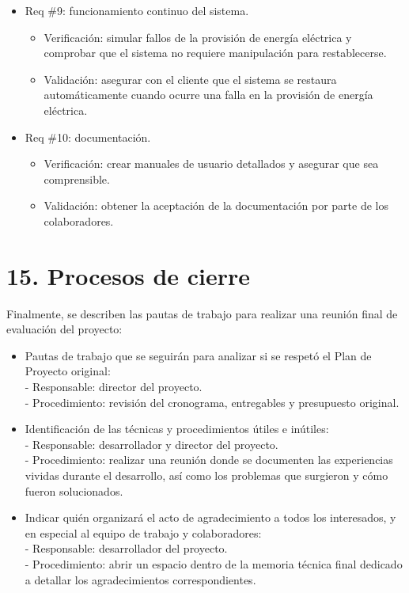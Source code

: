 \documentclass[
11pt, %
]{charter}
\begin{document}
\begin{itemize} 
\item Req \#9: funcionamiento continuo del sistema.
	\begin{itemize}
	\item Verificación: simular fallos de la provisión de energía eléctrica y comprobar que el sistema no requiere manipulación para restablecerse.
	\item Validación: asegurar con el cliente que el sistema se restaura automáticamente cuando ocurre una falla en la provisión de energía eléctrica.
	\end{itemize}
\end{itemize}

\begin{itemize} 
\item Req \#10: documentación.
	\begin{itemize}
	\item Verificación: crear manuales de usuario detallados y asegurar que sea comprensible.
	\item Validación: obtener la aceptación de la documentación por parte de los colaboradores.
	\end{itemize}
\end{itemize}

\section{15. Procesos de cierre}    
\label{sec:cierre}

Finalmente, se describen las pautas de trabajo para realizar una reunión final de evaluación del proyecto:

\begin{itemize}
	\item Pautas de trabajo que se seguirán para analizar si se respetó el Plan de Proyecto original:\\
	 - Responsable: director del proyecto.\\
	 - Procedimiento: revisión del cronograma, entregables y presupuesto original.
	\item Identificación de las técnicas y procedimientos útiles e inútiles:\\
	 - Responsable: desarrollador y director del proyecto.\\
	 - Procedimiento: realizar una reunión donde se documenten las experiencias vividas durante el desarrollo, así como los problemas que surgieron y cómo fueron solucionados.
	\item Indicar quién organizará el acto de agradecimiento a todos los interesados, y en especial al equipo de trabajo y colaboradores:\\
	 - Responsable: desarrollador del proyecto.\\
	 - Procedimiento: abrir un espacio dentro de la memoria técnica final dedicado a detallar los agradecimientos correspondientes.
\end{itemize}
\end{document}
